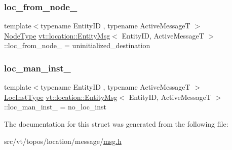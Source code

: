 \mbox{\label{structvt_1_1location_1_1_entity_msg_a4e1bc853e380b513f04eddb25f6e0cd7}} 
\subsubsection{\texorpdfstring{loc\+\_\+from\+\_\+node\+\_\+}{loc\_from\_node\_}}
{\footnotesize\ttfamily template$<$typename Entity\+ID , typename Active\+MessageT $>$ \\
\hyperlink{namespacevt_a866da9d0efc19c0a1ce79e9e492f47e2}{Node\+Type} \hyperlink{structvt_1_1location_1_1_entity_msg}{vt\+::location\+::\+Entity\+Msg}$<$ Entity\+ID, Active\+MessageT $>$\+::loc\+\_\+from\+\_\+node\+\_\+ = uninitialized\+\_\+destination\hspace{0.3cm}{\ttfamily [private]}}

\mbox{\label{structvt_1_1location_1_1_entity_msg_a6a4e4b87147e3ce6b2c48c21e51d9995}} 
\subsubsection{\texorpdfstring{loc\+\_\+man\+\_\+inst\+\_\+}{loc\_man\_inst\_}}
{\footnotesize\ttfamily template$<$typename Entity\+ID , typename Active\+MessageT $>$ \\
\hyperlink{namespacevt_1_1location_a4db6456e8024af2d23fc5ae560fef866}{Loc\+Inst\+Type} \hyperlink{structvt_1_1location_1_1_entity_msg}{vt\+::location\+::\+Entity\+Msg}$<$ Entity\+ID, Active\+MessageT $>$\+::loc\+\_\+man\+\_\+inst\+\_\+ = no\+\_\+loc\+\_\+inst\hspace{0.3cm}{\ttfamily [private]}}



The documentation for this struct was generated from the following file\+:\begin{DoxyCompactItemize}
\item 
src/vt/topos/location/message/\hyperlink{msg_8h}{msg.\+h}\end{DoxyCompactItemize}

